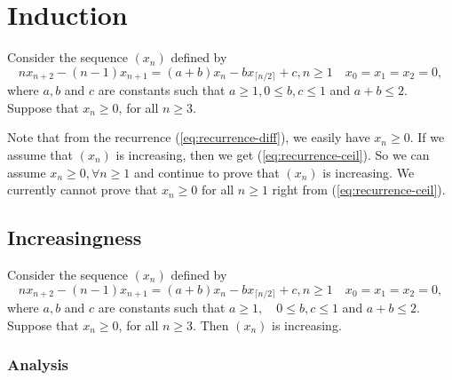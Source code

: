 \chapter{Induction}

Consider the sequence $(x_n)$ defined by
\begin{equation}
  \label{eq:recurrence-ceil}
  nx_{n+2} - (n-1)x_{n+1} = (a+b)x_n - b x_{\lceil n/2\rceil} + c, n\ge 1 \quad x_0 = x_1 = x_2 = 0,
\end{equation}
where $a,b$ and $c$ are constants such that $a\ge1, 0 \le b,c \le 1$ and $a+b\le 2$. Suppose that $x_n\ge 0$, for all $n\ge 3$.

Note that from the recurrence (\ref{eq:recurrence-diff}), we easily have $x_n\ge 0$. If we assume that $(x_n)$ is increasing, then we get (\ref{eq:recurrence-ceil}). So we can assume $x_n\ge 0,\forall n\ge 1$ and continue to prove that $(x_n)$ is increasing. We currently cannot prove that $x_n\ge 0$ for all $n\ge 1$ right from (\ref{eq:recurrence-ceil}).

\section{Increasingness}

\begin{proposition}
  \label{prop:recurrence-ceil}
  Consider the sequence $(x_n)$ defined by
  \begin{equation}
    nx_{n+2} - (n-1)x_{n+1} = (a+b)x_n - b x_{\lceil n/2\rceil} + c, n\ge 1 \quad x_0 = x_1 = x_2 = 0,
  \end{equation}
  where $a,b$ and $c$ are constants such that $a\ge1, \quad 0 \le b,c \le 1$ and $a+b\le 2$. Suppose that $x_n\ge 0$, for all $n\ge 3$. Then $(x_n)$ is increasing.
\end{proposition}


\subsection{Analysis}

